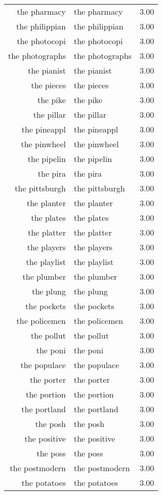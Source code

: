 \begin{table}[ht]
\begin{tabular}{rlr}
  the pharmacy & the pharmacy & 3.00 \\ 
  the philippian & the philippian & 3.00 \\ 
  the photocopi & the photocopi & 3.00 \\ 
  the photographs & the photographs & 3.00 \\ 
  the pianist & the pianist & 3.00 \\ 
  the pieces & the pieces & 3.00 \\ 
  the pike & the pike & 3.00 \\ 
  the pillar & the pillar & 3.00 \\ 
  the pineappl & the pineappl & 3.00 \\ 
  the pinwheel & the pinwheel & 3.00 \\ 
  the pipelin & the pipelin & 3.00 \\ 
  the pira & the pira & 3.00 \\ 
  the pittsburgh & the pittsburgh & 3.00 \\ 
  the planter & the planter & 3.00 \\ 
  the plates & the plates & 3.00 \\ 
  the platter & the platter & 3.00 \\ 
  the players & the players & 3.00 \\ 
  the playlist & the playlist & 3.00 \\ 
  the plumber & the plumber & 3.00 \\ 
  the plung & the plung & 3.00 \\ 
  the pockets & the pockets & 3.00 \\ 
  the policemen & the policemen & 3.00 \\ 
  the pollut & the pollut & 3.00 \\ 
  the poni & the poni & 3.00 \\ 
  the populace & the populace & 3.00 \\ 
  the porter & the porter & 3.00 \\ 
  the portion & the portion & 3.00 \\ 
  the portland & the portland & 3.00 \\ 
  the posh & the posh & 3.00 \\ 
  the positive & the positive & 3.00 \\ 
  the poss & the poss & 3.00 \\ 
  the postmodern & the postmodern & 3.00 \\ 
  the potatoes & the potatoes & 3.00 \\ 

\end{tabular}
\end{table}
